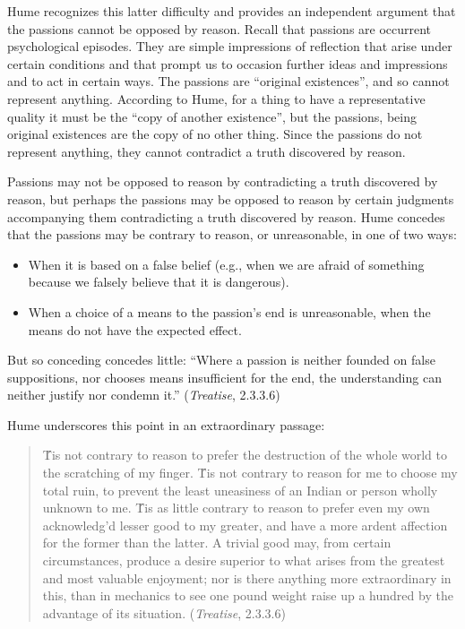 Hume recognizes this latter difficulty and provides an independent argument that the passions cannot be opposed by reason. Recall that passions are occurrent psychological episodes. They are simple impressions of reflection that arise under certain conditions and that prompt us to occasion further ideas and impressions and to act in certain ways. The passions are ``original existences'', and so cannot represent anything. According to Hume, for a thing to have a representative quality it must be the ``copy of another existence'', but the passions, being original existences are the copy of no other thing. Since the passions do not represent anything, they cannot contradict a truth discovered by reason.

Passions may not be opposed to reason by contradicting a truth discovered by reason, but perhaps the passions may be opposed to reason by certain judgments accompanying them contradicting a truth discovered by reason. Hume concedes that the passions may be contrary to reason, or unreasonable, in one of two ways:

\begin{itemize}
    \item When it is based on a false belief (e.g., when we are afraid of something because we falsely believe that it is dangerous).
    \item When a choice of a means to the passion's end is unreasonable, when the means do not have the expected effect.
\end{itemize}

But so conceding concedes little: ``Where a passion is neither founded on false suppositions, nor chooses means insufficient for the end, the understanding can neither justify nor condemn it.'' (\emph{Treatise}, 2.3.3.6)

Hume underscores this point in an extraordinary passage:

\begin{quote}
    \'Tis not contrary to reason to prefer the destruction of the whole world to the scratching of my finger. \'Tis not contrary to reason for me to choose my total ruin, to prevent the least uneasiness of an Indian or person wholly unknown to me. \'Tis as little contrary to reason to prefer even my own acknowledg'd lesser good to my greater, and have a more ardent affection for the former than the latter. A trivial good may, from certain circumstances, produce a desire superior to what arises from the greatest and most valuable enjoyment; nor is there anything more extraordinary in this, than in mechanics to see one pound weight raise up a hundred by the advantage of its situation. (\emph{Treatise}, 2.3.3.6)
\end{quote}

